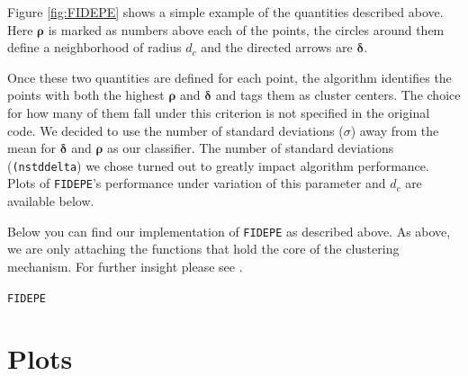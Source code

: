 \documentclass[12pt]{article}
\begin{document}
\FloatBarrier
Figure \ref{fig:FIDEPE} shows a simple example of the quantities described above. Here $\boldsymbol{\rho}$ is marked as numbers above each of the points, the circles around them define a neighborhood of radius $d_c$ and the directed arrows are $\boldsymbol{\delta}$.
\par Once these two quantities are defined for each point, the algorithm identifies the points with both the highest $\boldsymbol{\rho}$ and $\boldsymbol{\delta}$ and tags them as cluster centers. The choice for how many of them fall under this criterion is not specified in the original code. We decided to use the number of standard deviations ($\sigma$) away from the mean for $\boldsymbol{\delta}$ and $\boldsymbol{\rho}$ as our classifier. The number of standard deviations (\texttt{(nstddelta}) we chose turned out to greatly impact algorithm performance. Plots of \texttt{FIDEPE}'s performance under variation of this parameter and $d_c$ are available below.

Below you can find our implementation of \texttt{FIDEPE} as described above. As above, we are only attaching the functions that hold the core of the clustering mechanism. For further insight please see \cite{git}.

\singlespacing
\begin{center}
\texttt{FIDEPE}
\end{center}

\doublespacing
{}
\section{Plots}
\end{document}

